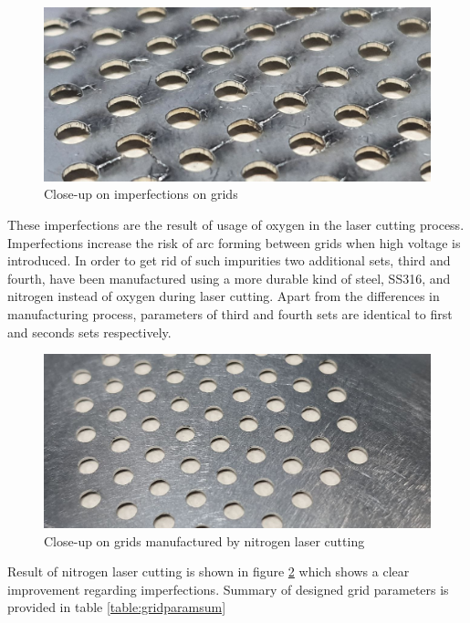 \begin{figure}[ht]
    \centering
    \includegraphics[scale=0.25]{fig/imperfect1.jpeg}
    \caption{Close-up on imperfections on grids}
    \label{fig:imperfect2}
\end{figure}
\newpage
These imperfections are the result of usage of oxygen in the laser cutting process. Imperfections increase the risk of arc forming between grids when high voltage is introduced. In order to get rid of such impurities two additional sets, third and fourth, have been manufactured using a more durable kind of steel, SS316, and nitrogen instead of oxygen during laser cutting.  Apart from the differences in manufacturing process, parameters of third and fourth sets are identical to first and seconds sets respectively.

\begin{figure}[ht]
    \centering
    \includegraphics[scale=0.25]{fig/imperfect3.jpeg}
    \caption{Close-up on grids manufactured by nitrogen laser cutting}
    \label{fig:imperfect3}
\end{figure}

Result of nitrogen laser cutting is shown in figure \ref{fig:imperfect3} which shows a clear improvement regarding imperfections. Summary of designed grid parameters is provided in table \ref{table:gridparamsum}

